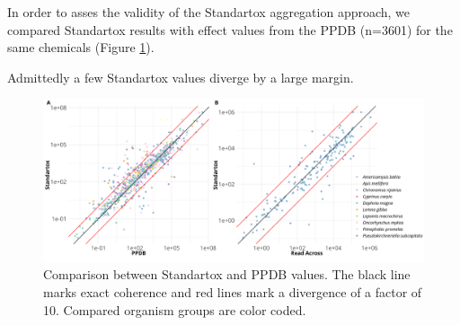 In order to asses the validity of the Standartox aggregation approach, we compared Standartox results with effect values from the PPDB (n=3601) for the same chemicals (Figure \ref{fig:standartox_ppdb_diff}). 

  Admittedly a few Standartox values diverge by a large margin.

\begin{figure}
    \includegraphics[width=1\linewidth]{article/figures/gg_ppdb_stan_compare_continous.png}
    \caption{Comparison between Standartox and PPDB values. The black line marks exact coherence and red lines mark a divergence of a factor of 10. Compared organism groups are color coded.}
    \label{fig:standartox_ppdb_diff}
\end{figure}

